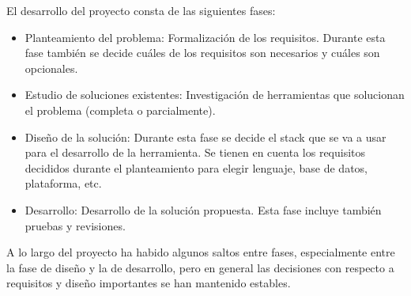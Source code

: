 El desarrollo del proyecto consta de las siguientes fases:

\begin{itemize}
    \item Planteamiento del problema: Formalización de los requisitos. Durante esta fase también se decide cuáles de los requisitos son necesarios y cuáles son opcionales.
    \item Estudio de soluciones existentes: Investigación de herramientas que solucionan el problema (completa o parcialmente).
    \item Diseño de la solución: Durante esta fase se decide el stack que se va a usar para el desarrollo de la herramienta. Se tienen en cuenta los requisitos decididos durante el planteamiento para elegir lenguaje, base de datos, plataforma, etc.
    \item Desarrollo: Desarrollo de la solución propuesta. Esta fase incluye también pruebas y revisiones.
\end{itemize}

A lo largo del proyecto ha habido algunos saltos entre fases, especialmente entre la fase de diseño y la de desarrollo, pero en general las decisiones con respecto a requisitos y diseño importantes se han mantenido estables. 
